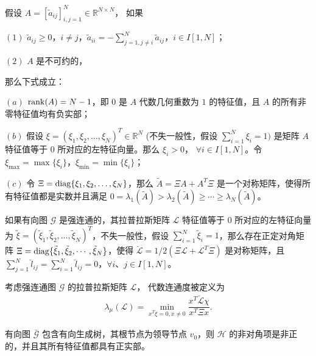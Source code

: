 \begin{lemma} \cite{lu2006new214}\label{l1-3-1}
    假设 $A=[\tilde{a}_{ij}]_{i,j=1}^{N}\in \mathbb{R}^{N\times N}$， 如果
    \begin{description}
        \item $(1)$ $\tilde{a}_{ij}\geq 0$，$i\neq j$，$ \tilde{a}_{ii}=-\sum\limits_{j=1,j\neq i}^{N}\tilde{a}_{ij}$，$i\in I[1,N]$；
        \item $(2)$ $A$ 是不可约的，
    \end{description}
    那么下式成立：
\begin{description}
\item $(a)$   ${\rm rank}(A)=N-1$，即 $0$ 是 $A$ 代数几何重数为 $1$ 的特征值，且 $A$ 的所有非零特征值均有负实部；  
\item $(b)$ 假设 $\xi=(\xi_1,\xi_2,\ldots,\xi_N)^T\in\mathbb{R}^{N}$ (不失一般性，假设 $\sum\limits_{i=1}^{N}\xi_i=1)$ 是矩阵 $A$ 特征值等于 $0$ 所对应的左特征向量。那么 $\xi_i>0$， $\forall i\in I[1,N]$。令 $\xi_{\max}=\max\{\xi_i\}$，$ \xi_{\min}=\min\{\xi_i\}$；
\item $(c)$ 令 $\Xi={\rm diag}\{\xi_1,\xi_2,\ldots,\xi_N\}$，那么  $\tilde{A}=\Xi A+A^T \Xi$ 是一个对称矩阵，使得所有特征值都是实数并且满足  $0=\lambda_1(\tilde{A})>\lambda_2(\tilde{A})\geq\cdots\geq\lambda_N(\tilde{A})$。
    \end{description}
\end{lemma} 
\begin{lemma} \cite{yu2009second881}\label{l1-3-2}
    如果有向图 $\mathcal{G}$ 是强连通的，其拉普拉斯矩阵 $\mathcal{L}$ 特征值等于 $0$ 所对应的左特征向量为 $\tilde{\xi}=(\tilde{\xi}_1,\tilde{\xi}_2,\ldots,\tilde{\xi}_N)^T$，不失一般性，假设 $\sum\limits_{i=1}^{N}\tilde{\xi}_i=1$，那么存在正定对角矩阵 $ \Xi={\rm diag}\{\tilde{\xi}_1,\tilde{\xi}_2,\cdots,\tilde{\xi}_N\}$，使得  $\breve{\mathcal{ L}}=1/2( \Xi \mathcal{ L}+ \mathcal{ L}^T \Xi)$ 是对称矩阵，且 $\sum\limits_{j=1}^{N}\breve{l}_{ij}=\sum\limits_{i=1}^{N}\breve{l}_{ij}=0$，$ \forall i$、$j\in I[1,N]$。 
\end{lemma} 
\begin{definition} \cite{godsil2001algebraic} 
考虑强连通图 $\mathcal{G}$ 的拉普拉斯矩阵 $\mathcal{L}$，
代数连通度被定义为  \begin{align*}\lambda_\mu(\mathcal{L})=\min\limits_{x^T \xi=0, x\neq0}\dfrac{x^T\breve{\mathcal{L}}\chi}{ x^T \Xi x}.  
 \end{align*}
\end{definition} 
\begin{lemma}\cite{2015Event1998}  \label{l1-3-3}
有向图 $\bar{\mathcal{G}}$  包含有向生成树，其根节点为领导节点 $v_0$，则 $\mathcal{H}$ 的非对角项是非正的，并且其所有特征值都具有正实部。 
\end{lemma}
